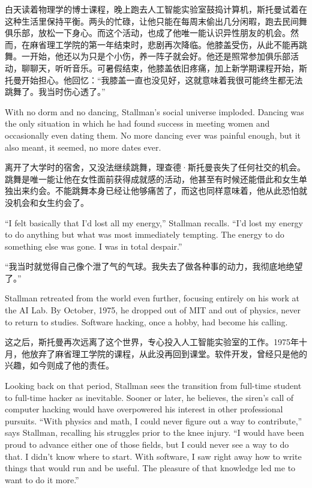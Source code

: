 \ifdefined\chs
白天读着物理学的博士课程，晚上跑去人工智能实验室鼓捣计算机，斯托曼试着在这种生活里保持平衡。两头的忙碌，让他只能在每周末偷出几分闲暇，跑去民间舞俱乐部，放松一下身心。而这个活动，也成了他唯一能认识异性朋友的机会。然而，在麻省理工学院的第一年结束时，悲剧再次降临。他膝盖受伤，从此不能再跳舞。一开始，他还以为只是个小伤，养一阵子就会好。他还是照常参加俱乐部活动，聊聊天，听听音乐。可暑假结束，他膝盖依旧疼痛，加上新学期课程开始，斯托曼开始担心。他回忆：``我膝盖一直也没见好，这就意味着我很可能终生都无法跳舞了。我当时伤心透了。''
\fi

\ifdefined\eng
With no dorm and no dancing, Stallman's social universe imploded. Dancing was the only situation in which he had found success in meeting women and occasionally even dating them. No more dancing ever was painful enough, but it also meant, it seemed, no more dates ever.
\fi

\ifdefined\chs
离开了大学时的宿舍，又没法继续跳舞，理查德·斯托曼丧失了任何社交的机会。跳舞是唯一能让他在女性面前获得成就感的活动，他甚至有时候还能借此和女生单独出来约会。不能跳舞本身已经让他够痛苦了，而这也同样意味着，他从此恐怕就没机会和女生约会了。
\fi

\ifdefined\eng
``I felt basically that I'd lost all my energy,'' Stallman recalls. ``I'd lost my energy to do anything but what was most immediately tempting. The energy to do something else was gone. I was in total despair.''
\fi

\ifdefined\chs
``我当时就觉得自己像个泄了气的气球。我失去了做各种事的动力，我彻底地绝望了。''
\fi

\ifdefined\eng
Stallman retreated from the world even further, focusing entirely on his work at the AI Lab. By October, 1975, he dropped out of MIT and out of physics, never to return to studies. Software hacking, once a hobby, had become his calling.
\fi

\ifdefined\chs
这之后，斯托曼再次远离了这个世界，专心投入人工智能实验室的工作。1975年十月，他放弃了麻省理工学院的课程，从此没再回到课堂。软件开发，曾经只是他的兴趣，如今则成了他的责任。
\fi

\ifdefined\eng
Looking back on that period, Stallman sees the transition from full-time student to full-time hacker as inevitable. Sooner or later, he believes, the siren's call of computer hacking would have overpowered his interest in other professional pursuits. ``With physics and math, I could never figure out a way to contribute,'' says Stallman, recalling his struggles prior to the knee injury. ``I would have been proud to advance either one of those fields, but I could never see a way to do that. I didn't know where to start. With software, I saw right away how to write things that would run and be useful. The pleasure of that knowledge led me to want to do it more.''
\fi

